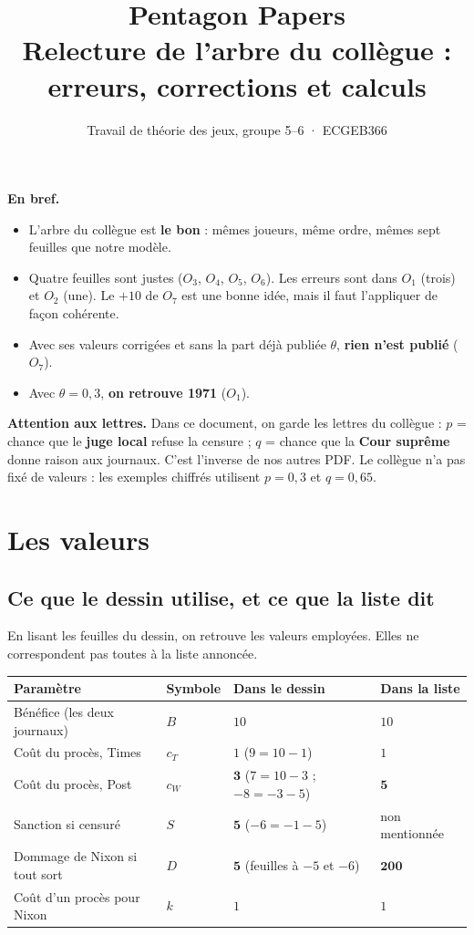 \documentclass[11pt,a4paper]{article}
\title{\textbf{Pentagon Papers}\\[3pt]\large Relecture de l'arbre du collègue : erreurs, corrections et calculs}
\author{Travail de théorie des jeux, groupe 5--6 · ECGEB366}
\date{}
\theoremstyle{definition}
\begin{document}
\maketitle
\vspace{-1.2cm}

\begin{resultat}
\textbf{En bref.}
\begin{itemize}[leftmargin=*,itemsep=1pt,topsep=2pt]
\item L'arbre du collègue est \textbf{le bon} : mêmes joueurs, même ordre, mêmes sept feuilles que notre modèle.
\item Quatre feuilles sont justes ($O_3$, $O_4$, $O_5$, $O_6$). Les erreurs sont dans $O_1$ (trois) et $O_2$ (une). Le $+10$ de $O_7$ est une bonne idée, mais il faut l'appliquer de façon cohérente.
\item Avec ses valeurs corrigées et sans la part déjà publiée $\theta$, \textbf{rien n'est publié} ($O_7$).
\item Avec $\theta=0,3$, \textbf{on retrouve 1971} ($O_1$).
\end{itemize}
\end{resultat}

\begin{discuter}
\textbf{Attention aux lettres.} Dans ce document, on garde les lettres du collègue : $p$ = chance que le \textbf{juge local} refuse la censure ; $q$ = chance que la \textbf{Cour suprême} donne raison aux journaux. C'est l'inverse de nos autres PDF. Le collègue n'a pas fixé de valeurs : les exemples chiffrés utilisent $p=0,3$ et $q=0,65$.
\end{discuter}

\section{Les valeurs}

\subsection{Ce que le dessin utilise, et ce que la liste dit}
En lisant les feuilles du dessin, on retrouve les valeurs employées. Elles ne correspondent pas toutes à la liste annoncée.
\begin{center}
\footnotesize
\begin{tabular}{@{}llll@{}}
\toprule
Paramètre & Symbole & Dans le dessin & Dans la liste \\
\midrule
Bénéfice (les deux journaux) & $B$ & $10$ & $10$ \\
Coût du procès, Times & $c_T$ & $1$ \quad ($9=10-1$) & $1$ \\
Coût du procès, Post & $c_W$ & $\mathbf{3}$ \quad ($7=10-3$ ; $-8=-3-5$) & $\mathbf{5}$ \\
Sanction si censuré & $S$ & $\mathbf{5}$ \quad ($-6=-1-5$) & non mentionnée \\
Dommage de Nixon si tout sort & $D$ & $\mathbf{5}$ \quad (feuilles à $-5$ et $-6$) & $\mathbf{200}$ \\
Coût d'un procès pour Nixon & $k$ & $1$ & $1$ \\
\bottomrule
\end{tabular}
\end{center}
\end{document}
